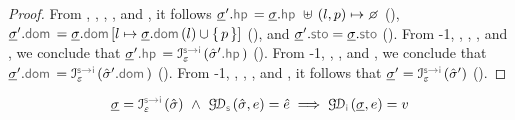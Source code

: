 \begin{proof}
 \noindent From , , , , and , it follows 
 $\istate'.\hpsel = \istate.\hpsel \dunion (\loc, p) \mapsto \none$ (), 
 $\istate'.\domsel = \istate.\domsel[\loc \mapsto \istate.\domsel(\loc) \cup \jsilset{p}]$ (), 
 and $\istate'.\stosel = \istate.\stosel$ (). 
 From \hyp{1}, ,  , , and , we conclude that $\istate'.\hpsel = \interpret{\symbinst}{\senv}(\sstate'.\hpsel)$ (). 
 From \hyp{1}, , , and , we conclude that $\istate'.\domsel =  \interpret{\symbinst}{\senv}(\sstate'.\domsel)$ (). 
 From \hyp{1}, , , , and , it follows that $\istate' = \interpret{\symbinst}{\senv}(\sstate')$ (). 
 \end{proof}


\begin{lemma}\label{lemma:getdomain:soundiness}
$$
\istate = \interpret{\symbinst}{\senv}(\sstate) \ \wedge \ 
  \absgetdomainfun{\symbolic}(\sstate, \jsilexpr) = \sexpr  
  \implies \absgetdomainfun{\instrumented}(\istate, \jsilexpr) = \val
$$
\end{lemma}
